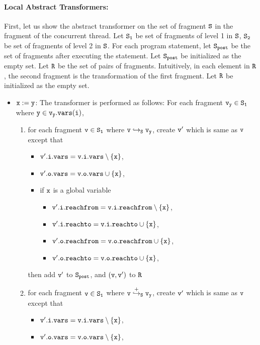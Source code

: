 \paragraph{Local Abstract Transformers:} First, let us show the abstract transformer on the set of fragment $\tt S$ in the fragment of the concurrent thread. Let $\tt S_1$ be set of fragments of level 1 in $\tt S$, $\tt S_2$ be set of fragments of level 2 in $\tt S$. For each program statement, let $\tt S_{post}$ be the set of fragments after executing the statement. Let $\tt S_{post}$ be initialized as the empty set.  Let $\tt R$ be the set of pairs of fragments. Intuitively, in each element in $\tt R$, the second fragment is the transformation of the first fragment. Let $\tt R$ be initialized as the empty set.
\begin{itemize}
\item ${\tt x := y}$: The transformer is performed as follows:  For each fragment $\tt v_y \in S_1$ where $\tt y \in v_y.{\tt vars}(\tt i)$, 
\begin{enumerate}
\item  for each fragment $\tt v \in S_1$ where $\tt v \hookrightarrow_S v_y$, create $\tt v'$ which is same as $\tt v$ except that
\begin{itemize}
\item $\tt v'.i.vars = v.i.vars \setminus \{x\}$,
\item $\tt v'.o.vars = v.o.vars \cup \{x\}$,
\item if $\tt x$ is a global variable
\begin{itemize}
\item $\tt v'.i.reachfrom = v.i.reachfrom \setminus \{x\}$,
\item $\tt v'.i.reachto = v.i.reachto \cup \{x\}$,
 \item $\tt v'.o.reachfrom = v.o.reachfrom \cup \{x\}$,
\item $\tt v'.o.reachto = v.o.reachto \cup \{x\}$,
\end{itemize}
\end{itemize}
then add $\tt v'$ to $\tt S_{post}$, and $\tt (v,v')$ to $\tt R$
\item for each fragment $\tt v \in S_1$ where $\tt v \overset{+}\hookrightarrow_S v_y$, create $\tt v'$ which is same as $\tt v$ except that
\begin{itemize}
\item $\tt v'.i.vars = v.i.vars \setminus \{x\}$,
\item $\tt v'.o.vars = v.o.vars \setminus \{x\}$,

\end{itemize}
\end{enumerate}
\end{itemize}
